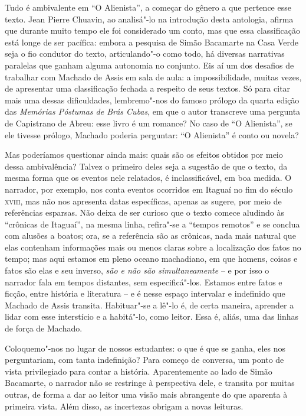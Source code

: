 \documentclass{extarticle}
\begin{document}

Tudo é ambivalente em ``O Alienista'', a começar do gênero a que
pertence esse texto. Jean Pierre Chuavin, ao analisá"-lo na introdução
desta antologia, afirma que durante muito tempo ele foi considerado um
conto, mas que essa classificação está longe de ser pacífica: embora a
pesquisa de Simão Bacamarte na Casa Verde seja o fio condutor do texto,
articulando"-o como todo, há diversas narrativas paralelas que ganham
alguma autonomia no conjunto. Eis aí um dos desafios de trabalhar com
Machado de Assis em sala de aula: a impossibilidade, muitas vezes, de
apresentar uma classificação fechada a respeito de seus textos. Só para
citar mais uma dessas dificuldades, lembremo"-nos do famoso prólogo da
quarta edição das \emph{Memórias Póstumas de Brás Cubas}, em que o autor
transcreve uma pergunta de Capistrano de Abreu: esse livro é um romance?
No caso de ``O Alienista'', se ele tivesse prólogo, Machado poderia
perguntar: ``O Alienista'' é conto ou novela?

Mas poderíamos questionar ainda mais: quais são os efeitos obtidos por
meio dessa ambivalência? Talvez o primeiro deles seja a sugestão de que
o texto, da mesma forma que os eventos nele relatados, é
inclassificável, em boa medida. O narrador, por exemplo, nos conta
eventos ocorridos em Itaguaí no fim do século \textsc{xviii}, mas não nos
apresenta datas específicas, apenas as sugere, por meio de referências
esparsas. Não deixa de ser curioso que o texto comece aludindo às
``crônicas de Itaguaí'', na mesma linha, refira"-se a ``tempos remotos''
e se conclua com alusões a boatos; ora, se a referência são as crônicas,
nada mais natural que elas contenham informações mais ou menos claras
sobre a localização dos fatos no tempo; mas aqui estamos em pleno oceano
machadiano, em que homens, coisas e fatos são elas e seu inverso,
\emph{são e não são simultaneamente} -- e por isso o narrador fala em
tempos distantes, sem especificá"-los. Estamos entre fatos e ficção,
entre história e literatura -- e é nesse espaço intervalar e indefinido
que Machado de Assis transita. Habituar"-se a lê"-lo é, de certa maneira,
aprender a lidar com esse interstício e a habitá"-lo, como leitor. Essa
é, aliás, uma das linhas de força de Machado.

Coloquemo"-nos no lugar de nossos estudantes: o que é que se ganha, eles
nos perguntariam, com tanta indefinição? Para começo de conversa, um
ponto de vista privilegiado para contar a história. Aparentemente ao
lado de Simão Bacamarte, o narrador não se restringe à perspectiva dele,
e transita por muitas outras, de forma a dar ao leitor uma visão mais
abrangente do que aparenta à primeira vista. Além disso, as incertezas
obrigam a novas leituras.
\end{document}
